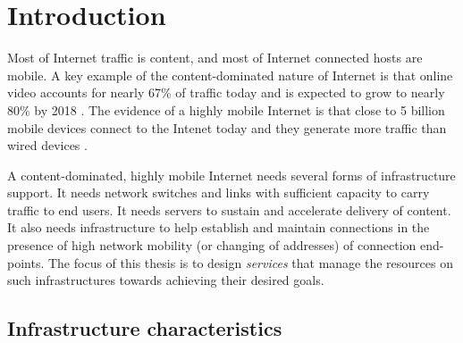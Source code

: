 \chapter{Introduction}

Most of Internet traffic is content, and most of Internet connected hosts are mobile. A key example of the content-dominated nature of Internet is that online video accounts for nearly 67\% of traffic today and is expected to grow to nearly 80\% by 2018 \cite{cisco-videogrowth}. The evidence of a highly mobile Internet is that close to 5 billion mobile devices connect to the Intenet today and they generate more traffic than wired devices \cite{cisco-vni}.


A content-dominated, highly mobile Internet needs several forms of infrastructure support. It needs network switches and links with sufficient capacity to carry traffic to end users. It needs servers to sustain and accelerate delivery of content. It also needs  infrastructure to help establish and maintain connections in the presence of high network mobility (or changing of addresses) of connection end-points. The focus of this thesis is to design \emph{services} that manage the resources on such infrastructures towards achieving their desired goals.




\section{Infrastructure characteristics}

